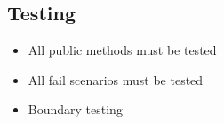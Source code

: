 \subsection{Testing}
\label{deftesting}
\begin{itemize}
  \item All public methods must be tested
  \item All fail scenarios must be tested
  \item Boundary testing
\end{itemize}
\newpage